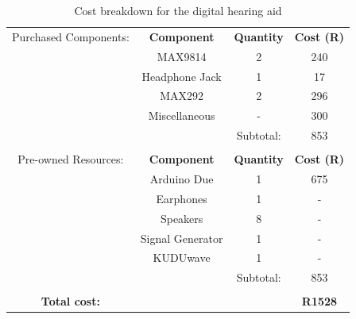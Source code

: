 \documentclass[10pt,twocolumn]{witseiepaper}
\begin{document}
\begin{table}[t]
	\centering
	\caption{Cost breakdown for the digital hearing aid}
	\label{tab:cost}
	\begin{tabular}{cccc}
		\cline{2-4}
		\multicolumn{1}{c|}{Purchased Components:}   & \multicolumn{1}{c|}{\textbf{Component}} & \multicolumn{1}{c|}{\textbf{Quantity}} & \multicolumn{1}{c|}{\textbf{Cost (R)}} \\ \cline{2-4} 
		\multicolumn{1}{c|}{} &  \multicolumn{1}{c|}{MAX9814}          & \multicolumn{1}{c|}{2}         & \multicolumn{1}{c|}{240}         \\ \cline{2-4} 
		\multicolumn{1}{c|}{}            & \multicolumn{1}{c|}{Headphone Jack}          & \multicolumn{1}{c|}{1}         & \multicolumn{1}{c|}{17}         \\ \cline{2-4} 
		\multicolumn{1}{c|}{}         &
		\multicolumn{1}{c|}{MAX292}            & \multicolumn{1}{c|}{2}          & \multicolumn{1}{c|}{296}    \\ \cline{2-4} 
		\multicolumn{1}{c|}{}         &
		\multicolumn{1}{c|}{Miscellaneous}            & \multicolumn{1}{c|}{-}           & \multicolumn{1}{c|}{300}    \\ \cline{2-4} 
		& \multicolumn{1}{c|}{}          & \multicolumn{1}{c|}{Subtotal:}         & \multicolumn{1}{c|}{853}         \\ \cline{3-4} 
		&                                &                               &                               \\ \cline{2-4} 
		\multicolumn{1}{c|}{Pre-owned Resources:}   & \multicolumn{1}{c|}{\textbf{Component}} & \multicolumn{1}{c|}{\textbf{Quantity}} & \multicolumn{1}{c|}{\textbf{Cost (R)}} \\ \cline{2-4} 
		\multicolumn{1}{c|}{} & \multicolumn{1}{c|}{Arduino Due}          & \multicolumn{1}{c|}{1}         & \multicolumn{1}{c|}{675}         \\ \cline{2-4} 
		\multicolumn{1}{c|}{}            & \multicolumn{1}{c|}{Earphones}          & \multicolumn{1}{c|}{1}         & \multicolumn{1}{c|}{ - }         \\ \cline{2-4} 
		\multicolumn{1}{c|}{}            & \multicolumn{1}{c|}{Speakers}          & \multicolumn{1}{c|}{8}         & \multicolumn{1}{c|}{ - }         \\ \cline{2-4}
		\multicolumn{1}{c|}{}            & \multicolumn{1}{c|}{Signal Generator}          & \multicolumn{1}{c|}{1}         & \multicolumn{1}{c|}{ - }         \\ \cline{2-4}
		\multicolumn{1}{c|}{}            & \multicolumn{1}{c|}{KUDUwave}          & \multicolumn{1}{c|}{1}         & \multicolumn{1}{c|}{ - }         \\ \cline{2-4}
		& \multicolumn{1}{c|}{}          & \multicolumn{1}{c|}{Subtotal:}         & \multicolumn{1}{c|}{853}         \\ \cline{3-4} \\ \hline
		\multicolumn{1}{c}{\textbf{Total cost:}}             & \multicolumn{1}{l}{}           & \multicolumn{1}{l}{}          & \multicolumn{1}{c}{\textbf{R1528}}  
	\end{tabular}
\end{table}
\end{document}

